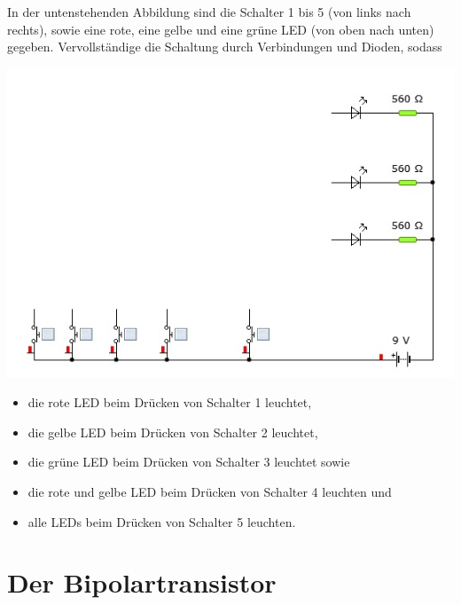 \begin{Aufgabe} \label{Aufg:Diodenlogik}

In der untenstehenden Abbildung sind die Schalter 1 bis 5 (von links nach rechts), sowie eine rote, eine gelbe und eine grüne LED (von oben nach unten) gegeben.
Vervollständige die Schaltung durch Verbindungen und Dioden, sodass

\begin{center}
\includegraphics[scale=.9]{pics/diodenlogik}
\end{center}

\begin{itemize}
\item die rote LED beim Drücken von Schalter 1 leuchtet,
\item die gelbe LED beim Drücken von Schalter 2 leuchtet,
\item die grüne LED beim Drücken von Schalter 3 leuchtet sowie
\item die rote und gelbe LED beim Drücken von Schalter 4 leuchten und
\item alle LEDs beim Drücken von Schalter 5 leuchten.
\end{itemize}
\end{Aufgabe}








\section{Der Bipolartransistor}


